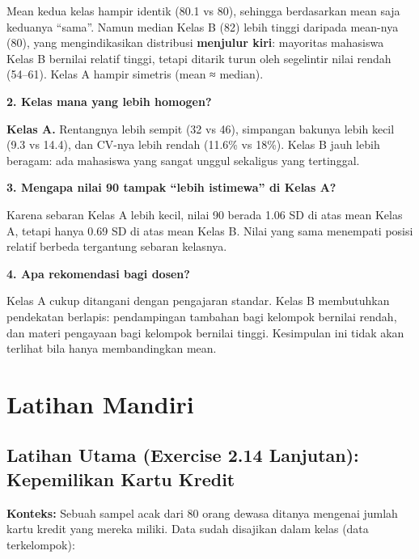 \documentclass[
  indonesian,
  letterpaper,
]{book}
\begin{document}
Mean kedua kelas hampir identik (80.1 vs 80), sehingga berdasarkan mean
saja keduanya ``sama''. Namun median Kelas B (82) lebih tinggi daripada
mean-nya (80), yang mengindikasikan distribusi \textbf{menjulur kiri}:
mayoritas mahasiswa Kelas B bernilai relatif tinggi, tetapi ditarik
turun oleh segelintir nilai rendah (54--61). Kelas A hampir simetris
(mean ≈ median).

\textbf{2. Kelas mana yang lebih homogen?}

\textbf{Kelas A.} Rentangnya lebih sempit (32 vs 46), simpangan bakunya
lebih kecil (9.3 vs 14.4), dan CV-nya lebih rendah (11.6\% vs 18\%).
Kelas B jauh lebih beragam: ada mahasiswa yang sangat unggul sekaligus
yang tertinggal.

\textbf{3. Mengapa nilai 90 tampak ``lebih istimewa'' di Kelas A?}

Karena sebaran Kelas A lebih kecil, nilai 90 berada 1.06 SD di atas mean
Kelas A, tetapi hanya 0.69 SD di atas mean Kelas B. Nilai yang sama
menempati posisi relatif berbeda tergantung sebaran kelasnya.

\textbf{4. Apa rekomendasi bagi dosen?}

Kelas A cukup ditangani dengan pengajaran standar. Kelas B membutuhkan
pendekatan berlapis: pendampingan tambahan bagi kelompok bernilai
rendah, dan materi pengayaan bagi kelompok bernilai tinggi. Kesimpulan
ini tidak akan terlihat bila hanya membandingkan mean.

\section{Latihan Mandiri}\label{latihan-mandiri-4}

\subsection{Latihan Utama (Exercise 2.14 Lanjutan): Kepemilikan Kartu
Kredit}\label{latihan-utama-exercise-2.14-lanjutan-kepemilikan-kartu-kredit}

\textbf{Konteks:} Sebuah sampel acak dari 80 orang dewasa ditanya
mengenai jumlah kartu kredit yang mereka miliki. Data sudah disajikan
dalam kelas (data terkelompok):
\end{document}

